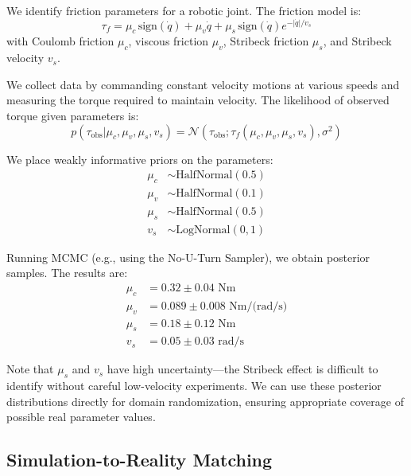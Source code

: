 \begin{example}
\label{ex:bayesian_friction}
We identify friction parameters for a robotic joint. The friction model is:
\begin{equation}
\tau_f = \mu_c \, \text{sign}(\dot{q}) + \mu_v \dot{q} + \mu_s \, \text{sign}(\dot{q}) e^{-|\dot{q}|/v_s}
\end{equation}
with Coulomb friction $\mu_c$, viscous friction $\mu_v$, Stribeck friction $\mu_s$, and Stribeck velocity $v_s$.

We collect data by commanding constant velocity motions at various speeds and measuring the torque required to maintain velocity. The likelihood of observed torque given parameters is:
\begin{equation}
p(\tau_{\text{obs}} | \mu_c, \mu_v, \mu_s, v_s) = \mathcal{N}(\tau_{\text{obs}}; \tau_f(\mu_c, \mu_v, \mu_s, v_s), \sigma^2)
\end{equation}

We place weakly informative priors on the parameters:
\begin{align}
\mu_c &\sim \text{HalfNormal}(0.5) \\
\mu_v &\sim \text{HalfNormal}(0.1) \\
\mu_s &\sim \text{HalfNormal}(0.5) \\
v_s &\sim \text{LogNormal}(0, 1)
\end{align}

Running MCMC (e.g., using the No-U-Turn Sampler), we obtain posterior samples. The results are:
\begin{align}
\mu_c &= 0.32 \pm 0.04 \text{ Nm} \\
\mu_v &= 0.089 \pm 0.008 \text{ Nm/(rad/s)} \\
\mu_s &= 0.18 \pm 0.12 \text{ Nm} \\
v_s &= 0.05 \pm 0.03 \text{ rad/s}
\end{align}

Note that $\mu_s$ and $v_s$ have high uncertainty---the Stribeck effect is difficult to identify without careful low-velocity experiments. We can use these posterior distributions directly for domain randomization, ensuring appropriate coverage of possible real parameter values.
\end{example}

\subsection{Simulation-to-Reality Matching}

